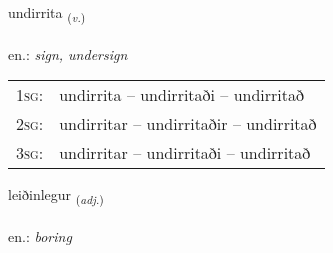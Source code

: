 \documentclass[frontgrid, backgrid]{flacards}\usepackage[]{graphicx}\usepackage[]{xcolor}
\begin{document}
\renewcommand{\flhead}{\vskip5pt \fboxsep=0pt {\small\bfseries\footnotesize Sagnorð | Verb}}
\renewcommand{\fcfoot}{\vskip5pt \fboxsep=0pt \hspace{2pt}{\small\bfseries\footnotesize 2K}}

\renewcommand{\blhead}{\vskip5pt {\small\bfseries\footnotesize Sagnorð | Verb }}
\renewcommand{\bcfoot}{\vskip5pt \hspace{2pt}{\small\bfseries\footnotesize 2K}}


{undirrita \small{\textsubscript{(\textit{v.})}} \\[1ex] %
\textphonetic{[ʏntɪrɪta]} \\
en.: \emph{sign, undersign} \\  [2ex]
\renewcommand*{\arraystretch}{0.8}
\begin{tabular}{p{1cm}l}
\textsc{1sg}: & undirrita -- undirritaði -- undirritað \\ 
\textsc{2sg}: & undirritar -- undirritaðir -- undirritað \\ 
\textsc{3sg}: & undirritar -- undirritaði -- undirritað \\ 
\end{tabular}
}

\renewcommand{\flhead}{\vskip5pt \fboxsep=0pt {\small\bfseries\footnotesize Lýsingarorð | Adjective}}
\renewcommand{\fcfoot}{\vskip5pt \fboxsep=0pt \hspace{2pt}{\small\bfseries\footnotesize 2K}}

\renewcommand{\blhead}{\vskip5pt {\small\bfseries\footnotesize Lýsingarorð | Adjective }}
\renewcommand{\bcfoot}{\vskip5pt \hspace{2pt}{\small\bfseries\footnotesize 2K}}


{leiðinlegur \small{\textsubscript{(\textit{adj.})}} \\[1ex] %
\textphonetic{[leiːðɪnlɛɣʏr]} \\
en.: \emph{boring} \\  [2ex]
\renewcommand*{\arraystretch}{0.8}
}
\end{document}
